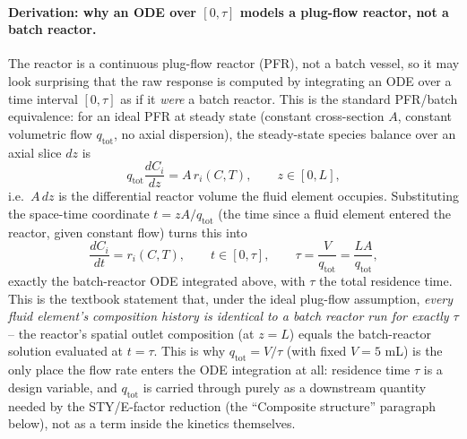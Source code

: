 \documentclass[11pt]{article}
\begin{document}
\paragraph{Derivation: why an ODE over $[0,\tau]$ models a plug-flow
reactor, not a batch reactor.} The reactor is a continuous plug-flow
reactor (PFR), not a batch vessel, so it may look surprising that the
raw response is computed by integrating an ODE over a time interval
$[0, \tau]$ as if it \emph{were} a batch reactor. This is the standard
PFR/batch equivalence: for an ideal PFR at steady state (constant
cross-section $A$, constant volumetric flow $q_{\mathrm{tot}}$, no
axial dispersion), the steady-state species balance over an axial
slice $dz$ is
\[
q_{\mathrm{tot}} \frac{dC_i}{dz} = A\, r_i(C, T), \qquad z \in [0, L],
\]
i.e.\ $A\, dz$ is the differential reactor volume the fluid element
occupies. Substituting the space-time coordinate $t = zA/q_{\mathrm{tot}}$
(the time since a fluid element entered the reactor, given constant
flow) turns this into
\[
\frac{dC_i}{dt} = r_i(C, T), \qquad t \in [0, \tau], \qquad
\tau = \frac{V}{q_{\mathrm{tot}}} = \frac{LA}{q_{\mathrm{tot}}},
\]
exactly the batch-reactor ODE integrated above, with $\tau$ the total
residence time. This is the textbook statement that, under the ideal
plug-flow assumption, \emph{every fluid element's composition history
is identical to a batch reactor run for exactly $\tau$} -- the reactor's
spatial outlet composition (at $z=L$) equals the batch-reactor solution
evaluated at $t=\tau$. This is why $q_{\mathrm{tot}} = V/\tau$
(with fixed $V=5$ mL) is the only place the flow rate enters the ODE
integration at all: residence time $\tau$ is a design variable, and
$q_{\mathrm{tot}}$ is carried through purely as a downstream quantity
needed by the STY/E-factor reduction (the ``Composite structure''
paragraph below), not as a term inside the kinetics themselves.
\end{document}
